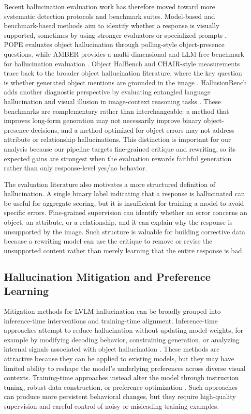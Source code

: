 \documentclass{article}
\begin{document}
Recent hallucination evaluation work has therefore moved toward more systematic detection protocols and benchmark suites. Model-based and benchmark-based methods aim to identify whether a response is visually supported, sometimes by using stronger evaluators or specialized prompts \citep{gunjal2024detecting,chen2024unified}. POPE evaluates object hallucination through polling-style object-presence questions, while AMBER provides a multi-dimensional and LLM-free benchmark for hallucination evaluation \citep{li2023pope,wang2023amber}. Object HalBench and CHAIR-style measurements trace back to the broader object hallucination literature, where the key question is whether generated object mentions are grounded in the image \citep{rohrbach2018object}. HallusionBench adds another diagnostic perspective by evaluating entangled language hallucination and visual illusion in image-context reasoning tasks \citep{guan2024hallusionbench}. These benchmarks are complementary rather than interchangeable: a method that improves long-form generation may not necessarily improve binary object-presence decisions, and a method optimized for object errors may not address attribute or relationship hallucinations. This distinction is important for our analysis because our pipeline targets fine-grained critique and rewriting, so its expected gains are strongest when the evaluation rewards faithful generation rather than only response-level yes/no behavior.

The evaluation literature also motivates a more structured definition of hallucination. A single binary label indicating that a response is hallucinated can be useful for aggregate scoring, but it is insufficient for training a model to avoid specific errors. Fine-grained supervision can identify whether an error concerns an object, an attribute, or a relationship, and it can explain why the response is unsupported by the image. Such structure is valuable for building corrective data because a rewriting model can use the critique to remove or revise the unsupported content rather than merely learning that the entire response is bad.

\subsection{Hallucination Mitigation and Preference Learning}

Mitigation methods for LVLM hallucination can be broadly grouped into inference-time interventions and training-time alignment. Inference-time approaches attempt to reduce hallucination without updating model weights, for example by modifying decoding behavior, constraining generation, or analyzing internal signals associated with object hallucination \citep{zhou2024analyzing}. These methods are attractive because they can be applied to existing models, but they may have limited ability to reshape the model's underlying preferences across diverse visual contexts. Training-time approaches instead alter the model through instruction tuning, robust data construction, or preference optimization \citep{liu2024robust,li2023silkie,yu2024rlhfv}. Such approaches can produce more persistent behavioral changes, but they require high-quality supervision and careful control of noisy or misleading training examples.
\end{document}
